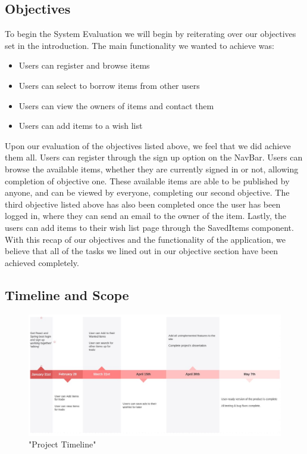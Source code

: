 \subsection{Objectives}
To begin the System Evaluation we will begin by reiterating over our objectives set in the introduction. The main functionality we wanted to achieve was:
\begin{itemize}
    \item Users can register and browse items
    \item Users can select to borrow items from other users
    \item Users can view the owners of items and contact them
    \item Users can add items to a wish list
\end{itemize}
\par Upon our evaluation of the objectives listed above, we feel that we did achieve them all. Users can register through the sign up option on the NavBar. Users can browse the available items, whether they are currently signed in or not, allowing completion of objective one. These available items are able to be published by anyone, and can be viewed by everyone, completing our second objective. The third objective listed above has also been completed once the user has been logged in, where they can send an email to the owner of the item. Lastly, the users can add items to their wish list page through the SavedItems component. With this recap of our objectives and the functionality of the application, we believe that all of the tasks we lined out in our objective section have been achieved completely. \par

\subsection{Timeline and Scope}
\begin{figure}[h]
\renewcommand\thefigure{5.1}
\centering
\includegraphics[scale=0.4]{img/timeline.png}
\caption{"Project Timeline"}
\label{Timeline}
\end{figure}

